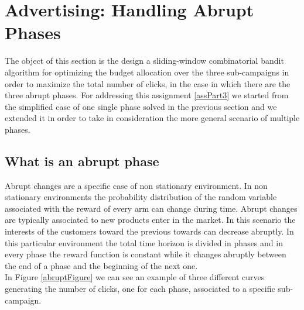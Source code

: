 \chapter{Advertising: Handling Abrupt Phases}

The object of this section is the design a sliding-window combinatorial bandit algorithm for optimizing the budget allocation over the three sub-campaigns in order to maximize the total number of clicks, in the case in which there are the three abrupt phases.
For addressing this assignment \ref{assPart3} we started from the simplified case of one single phase solved in the previous section and we extended it in order to take in consideration the more general scenario of multiple phases.\\

\section{What is an abrupt phase}
Abrupt changes are a specific case of non stationary environment.
In non stationary environments the probability distribution of the random variable associated with the reward of every arm can change during time.
Abrupt changes are typically associated to new products enter in the market. In this scenario the interests of the customers toward the previous towards can decrease abruptly.
In this particular environment the total time horizon is divided in phases and in every phase the reward function is constant while it changes abruptly between the end of a phase and the beginning of the next one.\\ In Figure \ref{abruptFigure} we can see an example of three different curves generating  the number of clicks, one for each phase, associated to a specific sub-campaign.
